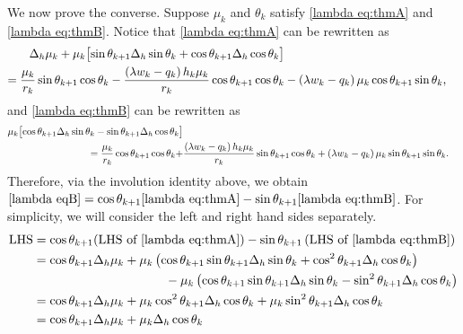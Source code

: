 \documentclass[12pt,reqno]{amsart}
\numberwithin{equation}{section}
\begin{document}
We now prove the converse. Suppose $\mu_k$ and $\theta_k$ satisfy \eqref{lambda eq:thmA} and \eqref{lambda eq:thmB}. Notice that \eqref{lambda eq:thmA} can be rewritten as
\begin{align}
\label{lambda eq:re-thmA}
\Delta_h \mu_k + \mu_k \bigl[ \sin\theta_{k+1} \Delta_h \sin\theta_k + \cos\theta_{k+1} \Delta_h \cos\theta_k \bigr] \notag \\ = \frac{\mu_k}{r_k} \sin\theta_{k+1} \cos\theta_k - \frac{\left(\lambda w_k-q_k\right) h_k \mu_k}{r_k} \cos\theta_{k+1} \cos\theta_k &- \left(\lambda w_k-q_k\right) \mu_k \cos\theta_{k+1} \sin\theta_k,
\end{align}
and \eqref{lambda eq:thmB} can be rewritten as 
\begin{align}
\label{lambda eq:re-thmB}
\mu_k \bigl[ \cos\theta_{k+1} \Delta_h \sin\theta_k - \sin\theta_{k+1} \Delta_h \cos\theta_k \bigr] \notag \\= \frac{\mu_k}{r_k} \cos\theta_{k+1} \cos\theta_k + &\frac{\left(\lambda w_k-q_k\right) h_k \mu_k}{r_k} \sin\theta_{k+1} \cos\theta_k + \left(\lambda w_k-q_k\right) \mu_k \sin\theta_{k+1} \sin\theta_k.
\end{align}
Therefore, via the involution identity above, we obtain  \(\eqref{lambda eqB}=\cos\theta_{k+1}\eqref{lambda eq:thmA}-\sin\theta_{k+1}\eqref{lambda eq:thmB}\).
For simplicity, we will consider the left and right hand sides separately.
\begin{align}
\notag \text{LHS}&=\cos\theta_{k+1}(\text{LHS of } \eqref{lambda eq:thmA})-\sin\theta_{k+1}\left(\text{LHS of }\eqref{lambda eq:thmB}\right)\notag\\
&=\cos\theta_{k+1}\Delta_h\mu_k+\mu_{k}\left(\cos\theta_{k+1}\sin\theta_{k+1}\Delta_h\sin\theta_k+\cos^2\theta_{k+1}\Delta_h\cos\theta_k\right) \notag \\ 
&\hspace{3.7cm}-\mu_k\left(\cos\theta_{k+1}\sin\theta_{k+1}\Delta_h\sin\theta_k-\sin^2\theta_{k+1}\Delta_h\cos\theta_k\right) \notag \\ 
&=\cos\theta_{k+1}\Delta_h\mu_k+\mu_k\cos^2\theta_{k+1}\Delta_h\cos\theta_k+\mu_k\sin^2\theta_{k+1}\Delta_h\cos\theta_k \notag \\ 
    & =\cos\theta_{k+1}\Delta_h\mu_k+\mu_k\Delta_h\cos\theta_k 
    \label{lambda eq:LHS-4.1}
\end{align}
\end{document}
